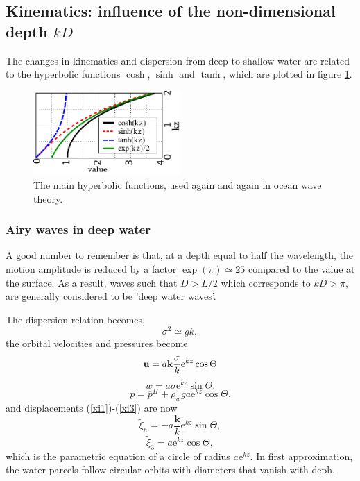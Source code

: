 \subsection{Kinematics: influence of the non-dimensional depth $kD$}
The changes in kinematics and dispersion from deep to shallow water are related to the hyperbolic functions $\cosh$, $\sinh$
and $\tanh$, which are plotted in figure \ref{coshsinh}.
\begin{figure}
\centerline{\includegraphics[width=0.5\textwidth]{FIGS_CH_AIRY/coshsinh_en.pdf}}
  \caption{The main hyperbolic functions, used again and again in ocean wave theory.}
\label{coshsinh}
\end{figure}


\subsubsection{Airy waves in deep water}
 A good number to remember is that, at a depth equal to half the
wavelength,  the motion amplitude is reduced by a factor $\exp(\pi) \simeq 25$ compared to the value at the surface.
As a result, waves such that $D > L/2$ which corresponds to $kD > \pi$, are generally considered to be 'deep water waves'.

The dispersion relation becomes, 
\begin{equation}
    \sigma^2 \simeq g k,
     \label{dispersion deep}
\end{equation}
the orbital velocities and pressures become
\begin{equation}
    \mathbf{u}=a{\mathbf k}\frac{\sigma}{k}
    {\mathrm e}^{kz}    \cos \Theta
\end{equation}
\begin{equation}
    w=a \sigma
    {\mathrm e}^{kz}    \sin \Theta.
\end{equation}
\begin{equation}
    p=\overline{p}^H+ \rho_w g a
    {\mathrm e}^{kz}    \cos \Theta.
\end{equation}
and displacements (\ref{xi1})-(\ref{xi3}) are now
\begin{equation}
    \widetilde{\xi}_h=-a \frac{\mathbf k}{k}
    {\mathrm e}^{kz}  \sin \Theta,
\end{equation}
\begin{equation}
    \widetilde{\xi}_3= a {\mathrm e}^{kz}  \cos \Theta,
\end{equation}
which is the parametric equation of a circle of radius $a {\mathrm e}^{kz}$.
In first approximation, the water parcels follow circular orbits with diameters that vanish with deph. 
 

